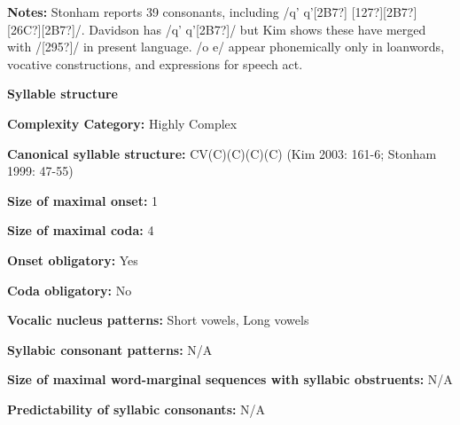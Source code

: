 \begin{styleBody}
\textbf{Notes:} Stonham reports 39 consonants, including /q’ q’[2B7?] [127?][2B7?] [26C?][2B7?]/. Davidson has /q’ q’[2B7?]/ but Kim shows these have merged with /[295?]/ in present language. /o e/ appear phonemically only in loanwords, vocative constructions, and expressions for speech act.
\end{styleBody}

\begin{styleBody}
\textbf{Syllable structure}
\end{styleBody}

\begin{styleBody}
\textbf{Complexity Category:} Highly Complex
\end{styleBody}

\begin{styleBody}
\textbf{Canonical syllable structure:} CV(C)(C)(C)(C)\textbf{ }(Kim 2003: 161-6; Stonham 1999: 47-55)
\end{styleBody}

\begin{styleBody}
\textbf{Size of maximal onset:} 1
\end{styleBody}

\begin{styleBody}
\textbf{Size of maximal coda:} 4
\end{styleBody}

\begin{styleBody}
\textbf{Onset obligatory:} Yes
\end{styleBody}

\begin{styleBody}
\textbf{Coda obligatory:} No
\end{styleBody}

\begin{styleBody}
\textbf{Vocalic nucleus patterns:} Short vowels, Long vowels
\end{styleBody}

\begin{styleBody}
\textbf{Syllabic consonant patterns:} N/A
\end{styleBody}

\begin{styleBody}
\textbf{Size of maximal word{}-marginal sequences with syllabic obstruents:} N/A
\end{styleBody}

\begin{styleBody}
\textbf{Predictability of syllabic consonants:} N/A
\end{styleBody}

